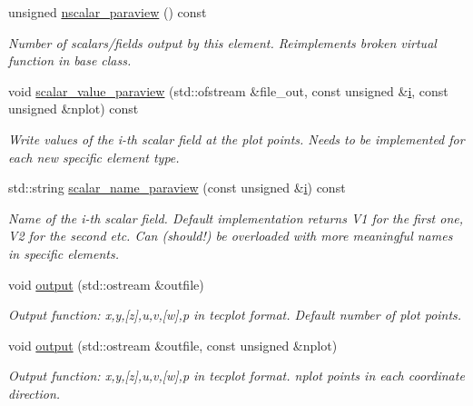 \begin{DoxyCompactItemize}
unsigned \hyperlink{classoomph_1_1GeneralisedNewtonianNavierStokesEquations_a25757f39f6d242dd96cf0856ecd1b58c}{nscalar\+\_\+paraview} () const
\begin{DoxyCompactList}\small\item\em Number of scalars/fields output by this element. Reimplements broken virtual function in base class. \end{DoxyCompactList}\item 
void \hyperlink{classoomph_1_1GeneralisedNewtonianNavierStokesEquations_a9f5f96dc41437cb571865588c98ef80e}{scalar\+\_\+value\+\_\+paraview} (std\+::ofstream \&file\+\_\+out, const unsigned \&\hyperlink{cfortran_8h_adb50e893b86b3e55e751a42eab3cba82}{i}, const unsigned \&nplot) const
\begin{DoxyCompactList}\small\item\em Write values of the i-\/th scalar field at the plot points. Needs to be implemented for each new specific element type. \end{DoxyCompactList}\item 
std\+::string \hyperlink{classoomph_1_1GeneralisedNewtonianNavierStokesEquations_a1fa3cbfd39cbe6fb6bfbd5a02e051aad}{scalar\+\_\+name\+\_\+paraview} (const unsigned \&\hyperlink{cfortran_8h_adb50e893b86b3e55e751a42eab3cba82}{i}) const
\begin{DoxyCompactList}\small\item\em Name of the i-\/th scalar field. Default implementation returns V1 for the first one, V2 for the second etc. Can (should!) be overloaded with more meaningful names in specific elements. \end{DoxyCompactList}\item 
void \hyperlink{classoomph_1_1GeneralisedNewtonianNavierStokesEquations_a1f84ecb8a91df11868349a1e826074bd}{output} (std\+::ostream \&outfile)
\begin{DoxyCompactList}\small\item\em Output function\+: x,y,\mbox{[}z\mbox{]},u,v,\mbox{[}w\mbox{]},p in tecplot format. Default number of plot points. \end{DoxyCompactList}\item 
void \hyperlink{classoomph_1_1GeneralisedNewtonianNavierStokesEquations_aadb72645b2396e206fc7765114364095}{output} (std\+::ostream \&outfile, const unsigned \&nplot)
\begin{DoxyCompactList}\small\item\em Output function\+: x,y,\mbox{[}z\mbox{]},u,v,\mbox{[}w\mbox{]},p in tecplot format. nplot points in each coordinate direction. \end{DoxyCompactList}\item 

\end{DoxyCompactItemize}
